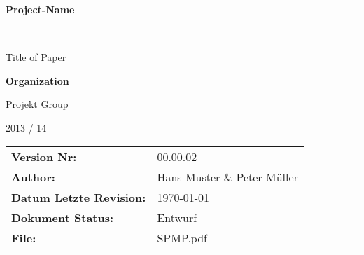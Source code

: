 \begin{titlepage}
\begin{flushright}
\LARGE \textbf{Project-Name}\\
\rule{12cm}{0.4pt}\\
\Large Title of Paper\\[0.5cm]
\end{flushright}
%
\noindent\hspace{7.0cm}\Large \textbf{Organization}\\\par
\noindent\hspace{7.0cm}\Large Projekt Group\\\par
\noindent\hspace{7.0cm}\Large 2013 / 14\\\par
%
\begin{flushright}
\begin{tabular}{ l p{4cm} }
    \small\textbf{Version Nr:} & \small 00.00.02 \\
    \small\textbf{Author:} & \small Hans Muster \& Peter Müller \\
    \small\textbf{Datum Letzte Revision:} & \small \today \\
    \small\textbf{Dokument Status:} & \small Entwurf \\
    \small\textbf{File:} & \small SPMP.pdf\\
\end{tabular}
\end{flushright}
%
\end{titlepage}
